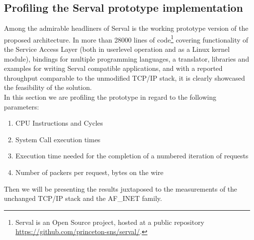 \newpage
\subsection{Profiling the Serval prototype implementation}
Among the admirable headliners of Serval is the working prototype version of the proposed architecture.
In more than 28000 lines of code\footnote{Serval is an Open Source project, hosted at a public repository\\ \url{https://github.com/princeton-sns/serval/}.} covering functionality of the Service Access Layer (both in userlevel operation and as a Linux kernel module), bindings for multiple programming languages, a translator, libraries and examples for writing Serval compatible applications, and with a reported throughput comparable to the unmodified TCP/IP stack, it is clearly showcased the feasibility of the solution.
\\ \indent In this section we are profiling the prototype in regard to the following parameters:
\begin{enumerate} \itemsep1pt \parskip0pt 
  \item CPU Instructions and Cycles
  \item System Call execution times
  \item Execution time needed for the completion of a numbered iteration of requests
  \item Number of packers per request, bytes on the wire
\end{enumerate}
Then we will be presenting the results juxtaposed to the measurements of the unchanged TCP/IP stack and the AF\_INET family.

